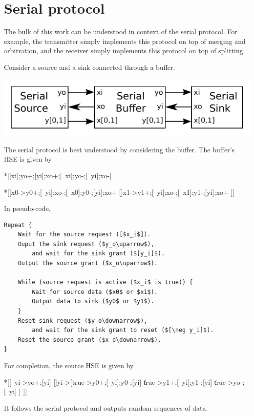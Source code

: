 \documentclass{article}
\begin{document}
\section{Serial protocol}

The bulk of this work can be understood in context of the serial protocol.
For example, the transmitter simply implements this protocol on top of merging
and arbitration, and the receiver simply implements this protocol on top of
splitting.

Consider a source and a sink connected through a buffer.
\begin{center}
    \includegraphics[width=.5\textwidth]{img/serial_protocol_block_diagram.pdf}
\end{center}

\noindent
The serial protocol is best understood by considering the buffer.
The buffer's HSE is given by
\begin{hse}
*[[xi];yo+;[yi];xo+;[~xi];yo-;[~yi];xo-]

*[[x0->y0+;[~yi];xo-;[~x0];y0-;[yi];xo+
  []x1->y1+;[~yi];xo-;[~x1];y1-;[yi];xo+
 ]]
\end{hse}

\noindent
In pseudo-code,
\begin{lstlisting}[mathescape]
Repeat {
    Wait for the source request ([$x_i$]).
    Ouput the sink request ($y_o\uparrow$),
        and wait for the sink grant ($[y_i]$).
    Output the source grant ($x_o\uparrow$).

    While (source request is active ($x_i$ is true)) {
        Wait for source data ($x0$ or $x1$).
        Output data to sink ($y0$ or $y1$).
    }
    Reset sink request ($y_o\downarrow$),
        and wait for the sink grant to reset ($[\neg y_i]$).
    Reset the source grant ($x_o\downarrow$).
}
\end{lstlisting}

\noindent
For completion, the source HSE is given by
\begin{hse}
*[[~yi->yo+;[yi]
  []yi->[true->y0+;[~yi];y0-;[yi]
         \|true->y1+;[~yi];y1-;[yi]
         \|true->yo-;[~yi]
         ]
 ]]
\end{hse}
It follows the serial protocol and outputs random sequences of data.
\end{document}
